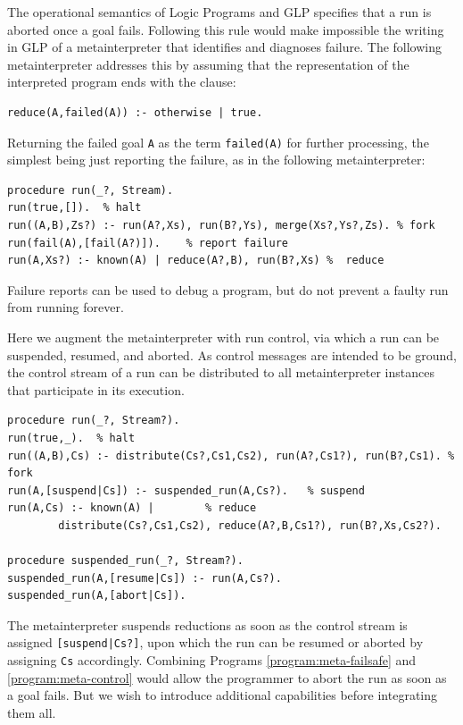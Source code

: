 %
The operational semantics of Logic Programs and GLP specifies that a run is aborted once a goal fails.  Following this rule would make impossible the writing in GLP of a metainterpreter that identifies and diagnoses failure.  The following metainterpreter addresses this by assuming that the  representation of the interpreted program ends with the clause:
\begin{verbatim}
reduce(A,failed(A)) :- otherwise | true.
\end{verbatim}
Returning the failed goal \verb|A| as the term \verb|failed(A)| for further processing, the simplest being just reporting the failure, as in the following metainterpreter:

\label{program:meta-failsafe}
\begin{small}
\begin{verbatim}
procedure run(_?, Stream).
run(true,[]).  % halt
run((A,B),Zs?) :- run(A?,Xs), run(B?,Ys), merge(Xs?,Ys?,Zs). % fork
run(fail(A),[fail(A?)]).    % report failure
run(A,Xs?) :- known(A) | reduce(A?,B), run(B?,Xs) %  reduce
\end{verbatim}
\end{small}

Failure reports can be used to debug a program, but do not prevent a faulty run from running forever.  

%
Here we augment the metainterpreter with run control, via which a run can be suspended, resumed, and aborted. 
As control messages are intended to be ground, the control stream of a run can be distributed to all metainterpreter instances that participate in its execution.

\label{program:meta-control}
\begin{small}
\begin{verbatim}
procedure run(_?, Stream?).
run(true,_).  % halt
run((A,B),Cs) :- distribute(Cs?,Cs1,Cs2), run(A?,Cs1?), run(B?,Cs1). % fork
run(A,[suspend|Cs]) :- suspended_run(A,Cs?).   % suspend
run(A,Cs) :- known(A) |        % reduce
        distribute(Cs?,Cs1,Cs2), reduce(A?,B,Cs1?), run(B?,Xs,Cs2?).

procedure suspended_run(_?, Stream?).
suspended_run(A,[resume|Cs]) :- run(A,Cs?).
suspended_run(A,[abort|Cs]).
\end{verbatim}
\end{small}
The metainterpreter suspends reductions as soon as the control stream is assigned \verb=[suspend|Cs?]=, upon which the run can be resumed or aborted by assigning \verb|Cs| accordingly. 
Combining Programs \ref{program:meta-failsafe} and \ref{program:meta-control} would allow the programmer to abort the run as soon as a goal fails.
But we wish to introduce additional capabilities before integrating them all.


